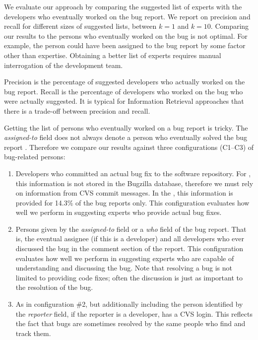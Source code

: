\documentclass[10pt]{book}
\begin{document}
We evaluate our approach by comparing the suggested list of experts with the developers who eventually worked on the bug report. We report on precision and recall for different sizes of suggested lists, between $k = 1$ and $k = 10$. Comparing our results to the persons who eventually worked on the bug is not optimal. For example, the person could have been assigned to the bug report by some factor other than expertise. Obtaining a better list of experts requires manual interrogation of the development team.

Precision is the percentage of suggested developers who actually worked on the bug report. Recall is the percentage of developers who worked on the bug who were actually suggested. It is typical for Information Retrieval approaches that there is a trade-off between precision and recall.

Getting the list of persons who eventually worked on a bug report is tricky. The \emph{assigned-to} field does not always denote a person who eventually solved the bug report \cite{Cubr04b, Anvi06a, Anvik07}. Therefore we compare our results against three configurations (C1--C3) of bug-related persons:

\begin{enumerate}
\item Developers who committed an actual bug fix to the software repository. For \EC, this information is not stored in the Bugzilla database, therefore we must rely on information from CVS commit messages. In the \validationset, this information is provided for 14.3\% of the bug reports only. This configuration evaluates how well we perform in suggesting experts who provide actual bug fixes.
\item Persons given by the \emph{assigned-to} field or a \emph{who} field of the bug report. That is, the eventual assignee (if this is a developer) and all developers who ever discussed the bug in the comment section of the report. This configuration evaluates how well we perform in suggesting experts who are capable of understanding and discussing the bug. Note that resolving a bug is not limited to providing code fixes; often the discussion is just as important to the resolution of the bug. 
\item As in configuration \#2, but additionally including the person identified by the \emph{reporter} field, if the reporter is a developer, \ie has a CVS login.  This reflects the fact that bugs are sometimes resolved by the same people who find and track them.
\end{enumerate}
\end{document}
